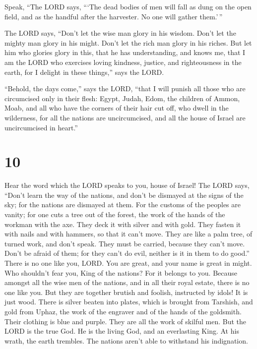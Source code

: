  Speak, ``The LORD says, ```The dead bodies of men will
fall as dung on the open field, and as the handful after the harvester.
No one will gather them.'\,''

 The LORD says, ``Don't let the wise man glory in his
wisdom. Don't let the mighty man glory in his might. Don't let the rich
man glory in his riches.  But let him who glories glory
in this, that he has understanding, and knows me, that I am the LORD who
exercises loving kindness, justice, and righteousness in the earth, for
I delight in these things,'' says the LORD.

 ``Behold, the days come,'' says the LORD, ``that I will
punish all those who are circumcised only in their flesh:
 Egypt, Judah, Edom, the children of Ammon, Moab, and all
who have the corners of their hair cut off, who dwell in the wilderness,
for all the nations are uncircumcised, and all the house of Israel are
uncircumcised in heart.''

\hypertarget{section-9}{%
\section{10}\label{section-9}}

 Hear the word which the LORD speaks to you, house of
Israel!  The LORD says, ``Don't learn the way of the
nations, and don't be dismayed at the signs of the sky; for the nations
are dismayed at them.  For the customs of the peoples are
vanity; for one cuts a tree out of the forest, the work of the hands of
the workman with the axe.  They deck it with silver and
with gold. They fasten it with nails and with hammers, so that it can't
move.  They are like a palm tree, of turned work, and
don't speak. They must be carried, because they can't move. Don't be
afraid of them; for they can't do evil, neither is it in them to do
good.''  There is no one like you, LORD. You are great,
and your name is great in might.  Who shouldn't fear you,
King of the nations? For it belongs to you. Because amongst all the wise
men of the nations, and in all their royal estate, there is no one like
you.  But they are together brutish and foolish,
instructed by idols! It is just wood.  There is silver
beaten into plates, which is brought from Tarshish, and gold from Uphaz,
the work of the engraver and of the hands of the goldsmith. Their
clothing is blue and purple. They are all the work of skilful men.
 But the LORD is the true God. He is the living God, and
an everlasting King. At his wrath, the earth trembles. The nations
aren't able to withstand his indignation.


